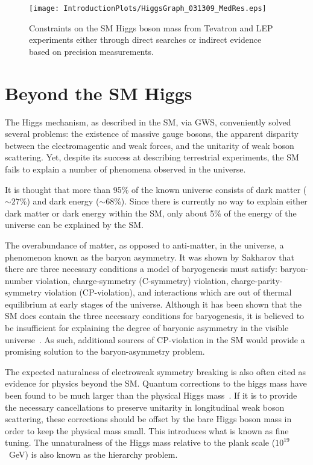 \begin{figure}
\begin{center}
\texttt{[image: IntroductionPlots/HiggsGraph\_031309\_MedRes.eps]}
\caption{Constraints on the SM Higgs boson mass from Tevatron and 
LEP experiments either through direct searches or indirect 
evidence based on precision measurements. 
}
\label{fig:HiggsConstraints}
\end{center}
\end{figure}

\section{Beyond the SM Higgs}

The Higgs mechanism, as described in the SM, 
via GWS, conveniently solved several problems: the existence of
massive gauge bosons, the apparent disparity between the 
electromagentic and weak forces, and the unitarity of weak boson 
scattering. Yet, despite its success at describing terrestrial 
experiments, the SM fails to explain a number of phenomena 
observed in the universe.
  
It is thought that more than 95\% of the known universe consists 
of dark matter ($\sim27$\%) and dark energy ($\sim68$\%)\cite{??}.
Since there is currently no way to explain either dark matter or 
dark energy within the SM, only about 5\% of the energy of 
the universe can be explained by the SM.  

The overabundance of matter, as opposed to anti-matter, in the 
universe, a phenomenon known as the baryon asymmetry.
It was shown by Sakharov\cite{Sakharov:1967dj} that there are 
three necessary 
conditions a model of baryogenesis must satisfy: baryon-number 
violation, charge-symmetry (C-symmetry) violation, 
charge-parity-symmetry violation (CP-violation), and interactions 
which are out of thermal equilibrium at early stages of the 
universe.  Although it has been shown that the SM does
contain the three necessary conditions for baryogenesis, it is 
believed to be insufficient for explaining the degree of baryonic 
asymmetry in the visible universe~\cite{???}.  As such, additional sources 
of CP-violation in the SM would provide a promising solution to 
the baryon-asymmetry problem.  

The expected naturalness of electroweak symmetry breaking is
also often cited as evidence for physics beyond the SM.  
Quantum corrections to the higgs mass have been found to be much 
larger than the physical Higgs mass~\cite{Aitchison:2007}. 
If it is to 
provide the 
necessary cancellations to preserve unitarity in longitudinal weak 
boson scattering, these corrections should be offset by the 
bare Higgs boson
mass in order to keep the physical mass small.  This introduces
what is known as fine tuning.  The unnaturalness of the Higgs mass
relative to the plank scale ($10^{19}$~GeV) is also known as the
hierarchy problem.

